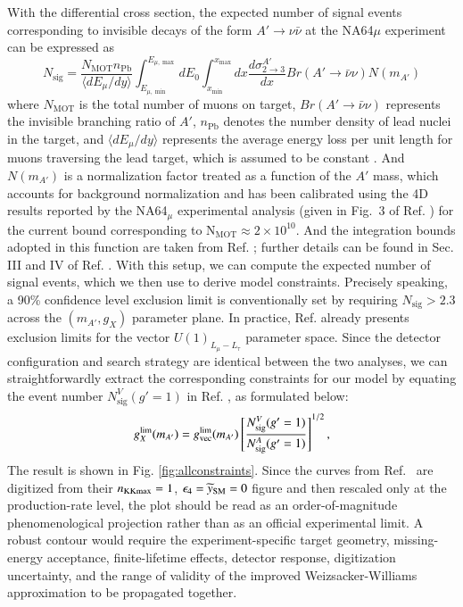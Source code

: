 \documentclass[onecolumn, aps, nofootinbib, prd, preprint, floats, floatfix, amsmath, amssymb, superscriptaddress, preprintnumbers]{revtex4-2}
\begin{document}
With the differential cross section, the expected number of signal events corresponding to invisible decays of the form $A' \to \nu\bar{\nu}$ at the NA64$\mu$ experiment can be expressed as
\begin{equation}
N_{\text{sig}} = \frac{N_{\text{MOT}} n_{\text{Pb}}}{\langle dE_\mu/dy \rangle} \int_{E_{\mu,\min}}^{E_{\mu,\max}} dE_0 \int_{x_{\min}}^{x_{\max}} dx \frac{d\sigma_{2\to3}^{A'}}{dx} Br(A' \to \bar{\nu}\nu) N(m_{A'})
\label{eq:NA64Signal}
\end{equation}
where $N_{\text{MOT}}$ is the total number of muons on target, $Br(A'\to\bar{\nu}\nu)$ represents the invisible branching ratio of $A'$, $n_{\text{Pb}}$ denotes the number density of lead nuclei in the target, and $\langle dE_\mu/dy\rangle$ represents the average energy loss per unit length for muons traversing the lead target, which is assumed to be constant \cite{navas2024review}. And $N(m_{A'})$ is a normalization factor treated as a function of the $A'$ mass, which accounts for background normalization and has been calibrated using the 4D results reported by the NA64$_\mu$ experimental analysis (given in Fig.~3 of Ref. \cite{andreev2024exploration}) for the current bound corresponding to $\mathrm{N_{MOT}} \approx 2 \times 10^{10}$. And the integration bounds adopted in this function are taken from Ref. \cite{Chakraborty:2025jbd}; further details can be found in Sec. III and IV of Ref. \cite{Chakraborty:2025jbd}. With this setup, we can compute the expected number of signal events, which we then use to derive model constraints. Precisely speaking, a 90\% confidence level exclusion limit is conventionally set by requiring $N_{\text{sig}} > 2.3$ across the $(m_{A'}, g_X)$ parameter plane. In practice, Ref. \cite{Chakraborty:2025jbd} already presents exclusion limits for the vector $U(1)_{L_\mu-L_\tau}$ parameter space. Since the detector configuration and search strategy are identical between the two analyses, we can straightforwardly extract the corresponding constraints for our model by equating the event number $N_{\text{sig}}^V(g'=1)$ in Ref. \cite{Chakraborty:2025jbd}, as formulated below:
\begin{equation}
g_X^{\rm lim}(m_{A'})
=g_{\rm vec}^{\rm lim}(m_{A'})
\left[
\frac{N_{\text{sig}}^V(g'=1)}{N_{\text{sig}}^A(g'=1)}
\right]^{1/2},
\label{eq:beamdump-rescale}
\end{equation}
The result is shown in Fig. \ref{fig:allconstraints}. Since the curves from Ref.~\cite{Chakraborty:2025jbd} are digitized from their $n_{\rm KKmax}=1$, $\epsilon_4=\widetilde y_{\rm SM}=0$ figure and then rescaled only at the production-rate level, the plot should be read as an order-of-magnitude phenomenological projection rather than as an official experimental limit. A robust contour would require the experiment-specific target geometry, missing-energy acceptance, finite-lifetime effects, detector response, digitization uncertainty, and the range of validity of the improved Weizsacker-Williams approximation to be propagated together.
\end{document}
